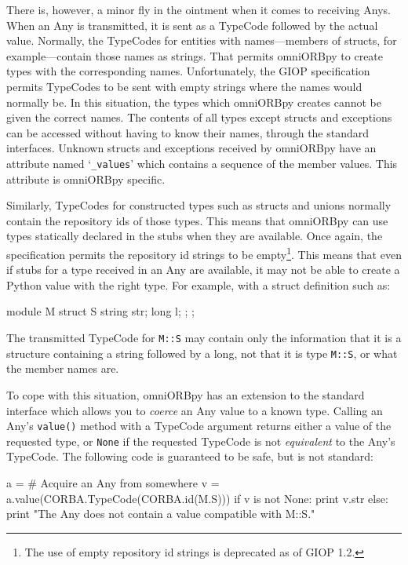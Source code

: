 \documentclass[draft,11pt,twoside,a4paper]{book}
\newcommand{\type}[1]{\texttt{#1}}
\newcommand{\code}[1]{\texttt{#1}}
\newcommand{\op}[1]{\texttt{#1()}}
\newcommand{\term}[1]{\textit{#1}}
\begin{document}
There is, however, a minor fly in the ointment when it comes to
receiving Anys. When an Any is transmitted, it is sent as a TypeCode
followed by the actual value.  Normally, the TypeCodes for entities
with names---members of structs, for example---contain those names as
strings. That permits omniORBpy to create types with the corresponding
names. Unfortunately, the GIOP specification permits TypeCodes to be
sent with empty strings where the names would normally be. In this
situation, the types which omniORBpy creates cannot be given the
correct names. The contents of all types except structs and exceptions
can be accessed without having to know their names, through the
standard interfaces. Unknown structs and exceptions received by
omniORBpy have an attribute named `\code{\_values}' which contains a
sequence of the member values. This attribute is omniORBpy specific.

Similarly, TypeCodes for constructed types such as structs and unions
normally contain the repository ids of those types. This means that
omniORBpy can use types statically declared in the stubs when they are
available. Once again, the specification permits the repository id
strings to be empty\footnote{The use of empty repository id strings is
deprecated as of GIOP 1.2.}. This means that even if stubs for a type
received in an Any are available, it may not be able to create a
Python value with the right type. For example, with a struct
definition such as:

\begin{idllisting}
module M {
  struct S {
    string str;
    long   l;
  };
};
\end{idllisting}

\noindent The transmitted TypeCode for \type{M::S} may contain only
the information that it is a structure containing a string followed by
a long, not that it is type \type{M::S}, or what the member names are.

To cope with this situation, omniORBpy has an extension to the
standard interface which allows you to \term{coerce} an Any value to a
known type. Calling an Any's \op{value} method with a TypeCode
argument returns either a value of the requested type, or \code{None}
if the requested TypeCode is not \term{equivalent} to the Any's
TypeCode. The following code is guaranteed to be safe, but is not
standard:

\begin{pylisting}
a = # Acquire an Any from somewhere
v = a.value(CORBA.TypeCode(CORBA.id(M.S)))
if v is not None:
    print v.str
else:
    print "The Any does not contain a value compatible with M::S."
\end{pylisting}
\end{document}
